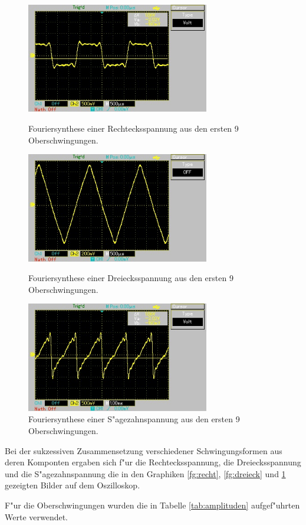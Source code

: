 \begin{figure}[!h]
	\centering
	\includegraphics[width = 8cm]{img/rechteck.jpg}
	\caption{Fouriersynthese einer Rechtecksspannung aus den ersten 9 Oberschwingungen.}
	\label{fg:recht}

	\includegraphics[width = 8cm]{img/dreieck.jpg}
	\caption{Fouriersynthese einer Dreiecksspannung aus den ersten 9 Oberschwingungen.}
	\label{fg:dreieck}

	\includegraphics[width = 8cm]{img/saege.jpg}
	\caption{Fouriersynthese einer S"agezahnspannung aus den ersten 9 Oberschwingungen.}
	\label{fg:saege}
\end{figure}



Bei der sukzessiven Zusammensetzung verschiedener Schwingungsformen aus deren Komponten ergaben sich f"ur die Rechtecksspannung, die Dreiecksspannung und die S"agezahnspannung die in den Graphiken \ref{fg:recht}, \ref{fg:dreieck} und \ref{fg:saege} gezeigten Bilder auf dem Oszilloskop.

F"ur die Oberschwingungen wurden die in Tabelle \ref{tab:amplituden} aufgef"uhrten Werte verwendet.